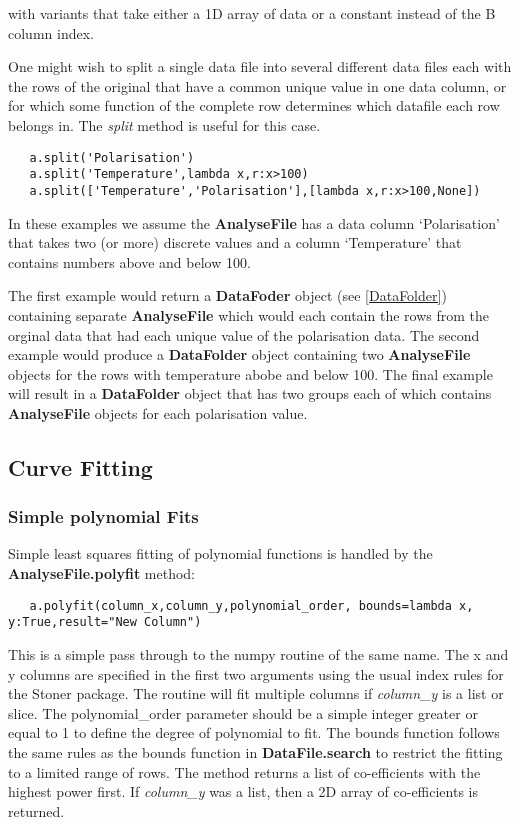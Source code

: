 \documentclass[a4paper,11pt]{scrartcl}
\begin{document}
with variants that take either a 1D array of data or a constant instead of the B column index.

One might wish to split a single data file into several different data files each with the rows of the original
that have a common unique value in one data column, or for which some function of the complete row determines which datafile
each row belongs in. The \textit{split} method is useful for this case.

\begin{lstlisting}
   a.split('Polarisation')
   a.split('Temperature',lambda x,r:x>100)
   a.split(['Temperature','Polarisation'],[lambda x,r:x>100,None])
\end{lstlisting}

In these examples we assume the \textbf{AnalyseFile} has a data column `Polarisation' that takes two (or more) discrete values
and a column `Temperature' that contains numbers above and below 100.

The first example would return a \textbf{DataFoder} object (see \ref{DataFolder}) containing separate \textbf{AnalyseFile} which
would each contain the rows from the orginal data that had each unique value of the polarisation data. The second example would
produce a \textbf{DataFolder} object containing two \textbf{AnalyseFile} objects for the rows with temperature abobe and below 100.
The final example will result in a \textbf{DataFolder} object that has two groups each of which contains \textbf{AnalyseFile} objects for each
polarisation value.

\subsection{Curve Fitting}

\subsubsection{Simple polynomial Fits}

Simple least squares fitting of polynomial functions is handled by the
\textbf{AnalyseFile.polyfit} method:

\begin{lstlisting}
   a.polyfit(column_x,column_y,polynomial_order, bounds=lambda x, y:True,result="New Column")
\end{lstlisting}

This is a simple pass through to the numpy routine of the same name. The x and y
columns are specified in the first two arguments using the usual index rules for
the Stoner package. The routine will fit multiple columns if \textit{column\_y}
is a list or slice. The polynomial\_order parameter should be a simple integer
greater or equal to 1 to define the degree of polynomial to fit. The bounds
function follows the same rules as the bounds function in
\textbf{DataFile.search} to restrict the fitting to a limited range of rows. The
method returns a list of co-efficients with the highest power first. If
\textit{column\_y} was a list, then a 2D array of co-efficients is returned.
\end{document}
